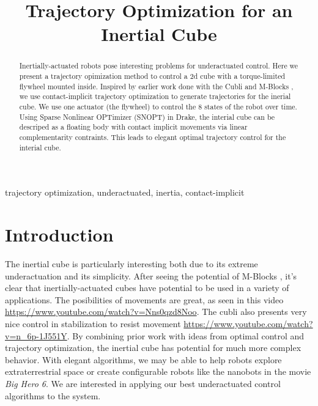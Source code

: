 \documentclass[conference]{IEEEtran}
\begin{document}
\title{Trajectory Optimization for an Inertial Cube \\
}

\author{
}

\maketitle

\begin{abstract}
Inertially-actuated robots pose interesting problems for underactuated control. Here we present a trajectory opimization method to control a 2d cube with a torque-limited flywheel mounted inside. Inspired by earlier work done with the Cubli \cite{b2} and M-Blocks \cite{b3}, we use contact-implicit trajectory optimization to generate trajectories for the inerial cube. We use one actuator (the flywheel) to control the 8 states of the robot over time. Using Sparse Nonlinear OPTimizer (SNOPT) in Drake, the interial cube can be descriped as a floating body with contact implicit movements via linear complementarity contraints. This leads to elegant optimal trajectory control for the interial cube.
\end{abstract}

\begin{IEEEkeywords}
trajectory optimization, underactuated, inertia, contact-implicit
\end{IEEEkeywords}

\section{Introduction}
The inertial cube is particularly interesting both due to its extreme underactuation and its simplicity. After seeing the potential of M-Blocks \cite{b3}, it's clear that inertially-actuated cubes have potential to be used in a variety of applications. The posibilities of movements are great, as seen in this video \url{https://www.youtube.com/watch?v=Nns0qzd8Noo}. The cubli also presents very nice control in stabilization to resist movement \url{https://www.youtube.com/watch?v=n_6p-1J551Y}. By combining prior work with ideas from optimal control and trajectory optimization, the inertial cube has potential for much more complex behavior. With elegant algorithms, we may be able to help robots explore extraterrestrial space \cite{b6} or create configurable robots like the nanobots in the movie \textit{Big Hero 6}. We are interested in applying our best underactuated control algorithms to the system.
\end{document}
